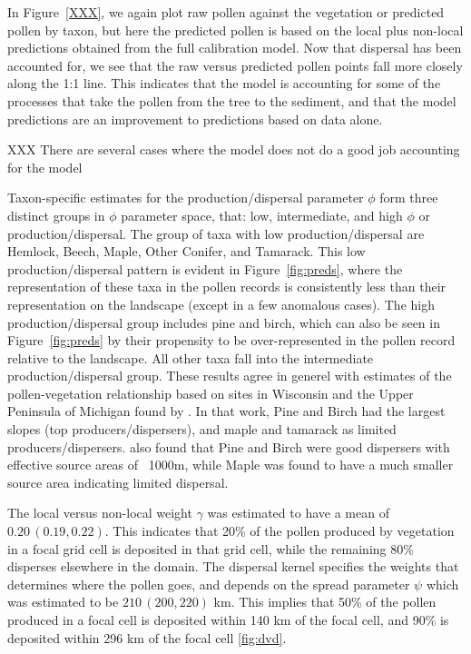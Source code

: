 \documentclass[12pt]{article}
\begin{document}
In Figure~\ref{XXX}, we again plot raw pollen against the vegetation
or predicted pollen by taxon, but here the predicted pollen is based
on the local plus non-local predictions obtained from the full
calibration model. Now that dispersal has been accounted for, we see
that the raw versus predicted pollen points fall more closely along
the 1:1 line. This indicates that the model is accounting for some of
the processes that take the pollen from the tree to the sediment, and
that the model predictions are an improvement to predictions based on
data alone.

XXX There are several cases where the model does not do a good job accounting for the model   

Taxon-specific estimates for the production/dispersal parameter $\phi$
form three distinct groups in $\phi$ parameter space, that: low,
intermediate, and high $\phi$ or production/dispersal. The group of
taxa with low production/dispersal are Hemlock, Beech, Maple, Other
Conifer, and Tamarack. This low production/dispersal pattern is
evident in Figure~\ref{fig:preds}, where the representation of these
taxa in the pollen records is consistently less than their
representation on the landscape (except in a few anomalous cases). The
high production/dispersal group includes pine and birch, which can
also be seen in Figure~\ref{fig:preds} by their propensity to be
over-represented in the pollen record relative to the landscape. All
other taxa fall into the intermediate production/dispersal
group. These results agree in generel with estimates of the
pollen-vegetation relationship based on sites in Wisconsin and the
Upper Peninsula of Michigan found by \cite{prentice1986}. In that
work, Pine and Birch had the largest slopes (top
producers/dispersers), and maple and tamarack as limited
producers/dispersers. \cite{jackson1990} also found that Pine and
Birch were good dispersers with effective source areas of ~1000m,
while Maple was found to have a much smaller source area indicating
limited dispersal.

The local versus non-local weight $\gamma$ was estimated to have a
mean of $0.20\,(0.19, 0.22)$. This indicates that 20\% of the pollen
produced by vegetation in a focal grid cell is deposited in that grid
cell, while the remaining 80\% disperses elsewhere in the domain. The
dispersal kernel specifies the weights that determines where the
pollen goes, and depends on the spread parameter $\psi$ which was
estimated to be $210\,(200, 220)$ km. This implies that 50\% of the
pollen produced in a focal cell is deposited within 140 km of the
focal cell, and 90\% is deposited within 296 km of the focal cell \ref{fig:dvd}.
\end{document}
